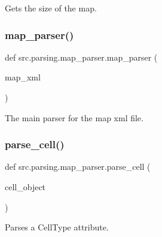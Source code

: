 \begin{DoxyVerb}Gets the size of the map.
\end{DoxyVerb}
 \hypertarget{namespacesrc_1_1parsing_1_1map__parser_a168e2a9de841161325b60d9b04e1c4f6}{}\label{namespacesrc_1_1parsing_1_1map__parser_a168e2a9de841161325b60d9b04e1c4f6} 
\subsubsection{\texorpdfstring{map\+\_\+parser()}{map\_parser()}}
{\footnotesize\ttfamily def src.\+parsing.\+map\+\_\+parser.\+map\+\_\+parser (\begin{DoxyParamCaption}\item[{}]{map\+\_\+xml }\end{DoxyParamCaption})}

\begin{DoxyVerb}The main parser for the map xml file.
\end{DoxyVerb}
 \hypertarget{namespacesrc_1_1parsing_1_1map__parser_a3ca3423b50510f49ec7b852bf2e46c66}{}\label{namespacesrc_1_1parsing_1_1map__parser_a3ca3423b50510f49ec7b852bf2e46c66} 
\subsubsection{\texorpdfstring{parse\+\_\+cell()}{parse\_cell()}}
{\footnotesize\ttfamily def src.\+parsing.\+map\+\_\+parser.\+parse\+\_\+cell (\begin{DoxyParamCaption}\item[{}]{cell\+\_\+object }\end{DoxyParamCaption})}

\begin{DoxyVerb}Parses a CellType attribute.
\end{DoxyVerb}
 